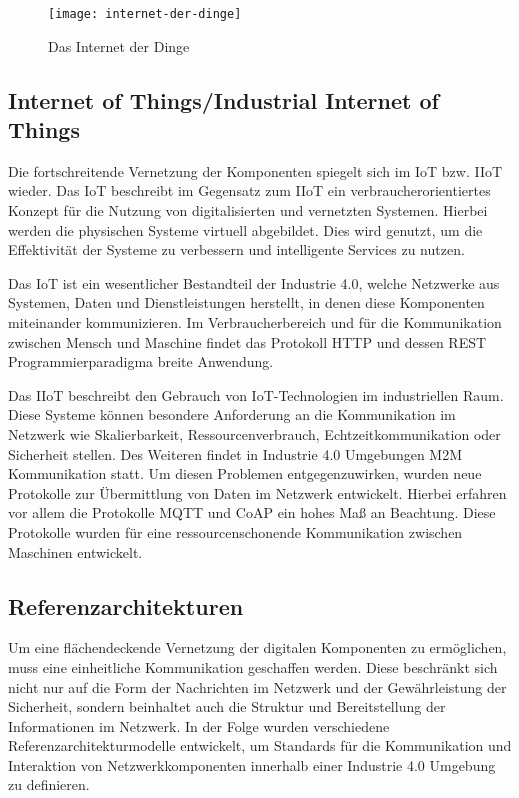\begin{figure}[h]
  \centering
  \texttt{[image: internet-der-dinge]}
  \caption{Das Internet der Dinge}
  \label{Grundlagen:Das Internet der Dinge}
\end{figure}

\subsection{Internet of Things/Industrial Internet of Things}
\label{Grundlagen:IoT/IIoT}
Die fortschreitende Vernetzung der Komponenten spiegelt sich im \ac{IoT} bzw. \ac{IIoT} wieder. Das \ac{IoT} beschreibt im Gegensatz zum \ac{IIoT} ein verbraucherorientiertes Konzept für die Nutzung von digitalisierten und vernetzten Systemen. Hierbei werden die physischen Systeme virtuell abgebildet. Dies wird genutzt, um die Effektivität der Systeme zu verbessern und intelligente Services zu nutzen.

Das \ac{IoT} ist ein wesentlicher Bestandteil der Industrie 4.0, welche Netzwerke aus Systemen, Daten und Dienstleistungen herstellt, in denen diese Komponenten miteinander kommunizieren. Im Verbraucherbereich und für die Kommunikation zwischen Mensch und Maschine findet das Protokoll \ac{HTTP} und dessen \ac{REST} Programmierparadigma breite Anwendung. 

Das \ac{IIoT} beschreibt den Gebrauch von \ac{IoT}-Technologien im industriellen Raum. Diese Systeme können besondere Anforderung an die Kommunikation im Netzwerk wie Skalierbarkeit, Ressourcenverbrauch, Echtzeitkommunikation oder Sicherheit stellen. Des Weiteren findet in Industrie 4.0 Umgebungen \ac{M2M} Kommunikation statt. Um diesen Problemen entgegenzuwirken, wurden neue Protokolle zur Übermittlung von Daten im Netzwerk entwickelt. Hierbei erfahren vor allem die Protokolle \ac{MQTT} und \ac{CoAP} ein hohes Maß an Beachtung. Diese Protokolle wurden für eine ressourcenschonende Kommunikation zwischen Maschinen entwickelt.

\subsection{Referenzarchitekturen}
Um eine flächendeckende Vernetzung der digitalen Komponenten zu ermöglichen, muss eine einheitliche Kommunikation geschaffen werden. Diese beschränkt sich nicht nur auf die Form der Nachrichten im Netzwerk und der Gewährleistung der Sicherheit, sondern beinhaltet auch die Struktur und Bereitstellung der Informationen im Netzwerk. In der Folge wurden verschiedene Referenzarchitekturmodelle entwickelt, um Standards für die Kommunikation und Interaktion von Netzwerkkomponenten innerhalb einer Industrie 4.0 Umgebung zu definieren.


